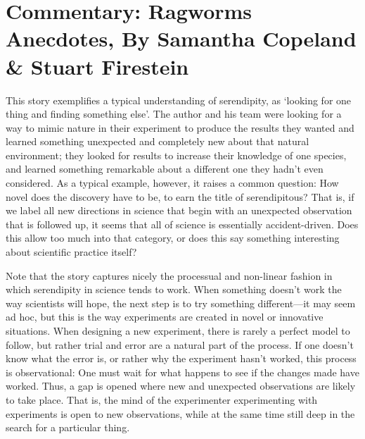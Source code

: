 \documentclass[authordate, commentary]{jote-new-article}
\author[1]{\mbox{Samantha Copeland\orcid{0000-0002-6946-7165}}}
\affil[1]{Delft University of Technology}
\author[2]{\mbox{Stuart Firestein\orcid{0000-0003-1774-5853}}}
\affil[2]{Columbia University}
\begin{document}
\begin{frontmatter}
  \maketitle
  \begin{abstract}
    \printabstracttext
  \end{abstract}
\end{frontmatter}


	\section{Commentary: Ragworms Anecdotes, By Samantha Copeland \& Stuart Firestein}



	This story exemplifies a typical understanding of serendipity, as ‘looking for one thing and finding something else'. The author and his team were looking for a way to mimic nature in their experiment to produce the results they wanted and learned something unexpected and completely new about that natural environment; they looked for results to increase their knowledge of one species, and learned something remarkable about a different one they hadn't even considered. As a typical example, however, it raises a common question: How novel does the discovery have to be, to earn the title of serendipitous? That is, if we label all new directions in science that begin with an unexpected observation that is followed up, it seems that all of science is essentially accident-driven. Does this allow too much into that category, or does this say something interesting about scientific practice itself?



	Note that the story captures nicely the processual and non-linear fashion in which serendipity in science tends to work. When something doesn't work the way scientists will hope, the next step is to try something different—it may seem ad hoc, but this is the way experiments are created in novel or innovative situations. When designing a new experiment, there is rarely a perfect model to follow, but rather trial and error are a natural part of the process. If one doesn't know what the error is, or rather why the experiment hasn't worked, this process is observational: One must wait for what happens to see if the changes made have worked. Thus, a gap is opened where new and unexpected observations are likely to take place. That is, the mind of the experimenter experimenting with experiments is open to new observations, while at the same time still deep in the search for a particular thing.
\end{document}
